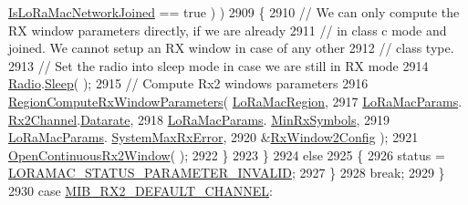 \begin{DoxyCode}
      \mbox{\hyperlink{_lo_ra_mac_8c_a17b05239ef8b6078a499010ede20ec54}{IsLoRaMacNetworkJoined}} == \textcolor{keyword}{true} ) )
2909                 \{
2910                     \textcolor{comment}{// We can only compute the RX window parameters directly, if we are already}
2911                     \textcolor{comment}{// in class c mode and joined. We cannot setup an RX window in case of any other}
2912                     \textcolor{comment}{// class type.}
2913                     \textcolor{comment}{// Set the radio into sleep mode in case we are still in RX mode}
2914                     \mbox{\hyperlink{sx1276mb1las_8c_acf9fe61a72c16fa29a0dc449d23e3820}{Radio}}.\mbox{\hyperlink{struct_radio__s_a5792613816e79c465be4169c0bc020cb}{Sleep}}( );
2915                     \textcolor{comment}{// Compute Rx2 windows parameters}
2916                     \mbox{\hyperlink{group___r_e_g_i_o_n_gabd3eb4e7db9b7987fabb9568f733a2b9}{RegionComputeRxWindowParameters}}( 
      \mbox{\hyperlink{_lo_ra_mac_8c_ab3e53bd4a0f4e547c9dbf450406acfe5}{LoRaMacRegion}},
2917                                                      \mbox{\hyperlink{_lo_ra_mac_8c_a4ae7d4019f8156167d8bcb97dff69a41}{LoRaMacParams}}.
      \mbox{\hyperlink{structs_lo_ra_mac_params_aa0fbe93ff398020c65d2431af19368e8}{Rx2Channel}}.\mbox{\hyperlink{structs_rx2_channel_params_a780280c12645b2666878162aab5d8cad}{Datarate}},
2918                                                      \mbox{\hyperlink{_lo_ra_mac_8c_a4ae7d4019f8156167d8bcb97dff69a41}{LoRaMacParams}}.
      \mbox{\hyperlink{structs_lo_ra_mac_params_ab33f97482f9af163d593cf103a2ccf1c}{MinRxSymbols}},
2919                                                      \mbox{\hyperlink{_lo_ra_mac_8c_a4ae7d4019f8156167d8bcb97dff69a41}{LoRaMacParams}}.
      \mbox{\hyperlink{structs_lo_ra_mac_params_a62adc341212fe903e9995966051c5fee}{SystemMaxRxError}},
2920                                                      &\mbox{\hyperlink{_lo_ra_mac_8c_abd43c1e7b17ac25a77382637f8a64cad}{RxWindow2Config}} );
2921                     \mbox{\hyperlink{_lo_ra_mac_8c_aeadfc508b9129926685664bc456db4f6}{OpenContinuousRx2Window}}( );
2922                 \}
2923             \}
2924             \textcolor{keywordflow}{else}
2925             \{
2926                 status = \mbox{\hyperlink{group___l_o_r_a_m_a_c_gga1d18f26b344040b3ec5c3db662919661ad0d3119f247d00e1787dda106fcb3017}{LORAMAC\_STATUS\_PARAMETER\_INVALID}};
2927             \}
2928             \textcolor{keywordflow}{break};
2929         \}
2930         \textcolor{keywordflow}{case} \mbox{\hyperlink{group___l_o_r_a_m_a_c_gga32ea83d13a3f5bb4b3ec2ace2319ab61ac3a212e314ab58f78007ce812187179d}{MIB\_RX2\_DEFAULT\_CHANNEL}}:

\end{DoxyCode}
